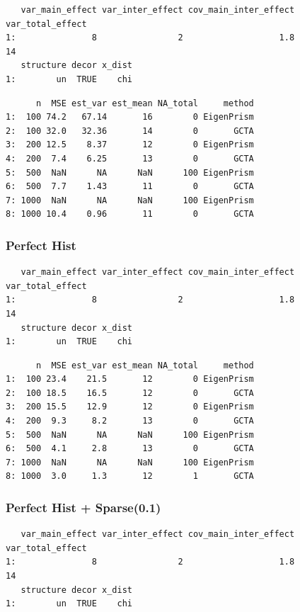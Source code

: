 \documentclass[]{article}
\begin{document}
\begin{verbatim}
   var_main_effect var_inter_effect cov_main_inter_effect var_total_effect
1:               8                2                   1.8               14
   structure decor x_dist
1:        un  TRUE    chi
\end{verbatim}

\begin{verbatim}
      n  MSE est_var est_mean NA_total     method
1:  100 74.2   67.14       16        0 EigenPrism
2:  100 32.0   32.36       14        0       GCTA
3:  200 12.5    8.37       12        0 EigenPrism
4:  200  7.4    6.25       13        0       GCTA
5:  500  NaN      NA      NaN      100 EigenPrism
6:  500  7.7    1.43       11        0       GCTA
7: 1000  NaN      NA      NaN      100 EigenPrism
8: 1000 10.4    0.96       11        0       GCTA
\end{verbatim}

\subsubsection{Perfect Hist}\label{perfect-hist}

\begin{verbatim}
   var_main_effect var_inter_effect cov_main_inter_effect var_total_effect
1:               8                2                   1.8               14
   structure decor x_dist
1:        un  TRUE    chi
\end{verbatim}

\begin{verbatim}
      n  MSE est_var est_mean NA_total     method
1:  100 23.4    21.5       12        0 EigenPrism
2:  100 18.5    16.5       12        0       GCTA
3:  200 15.5    12.9       12        0 EigenPrism
4:  200  9.3     8.2       13        0       GCTA
5:  500  NaN      NA      NaN      100 EigenPrism
6:  500  4.1     2.8       13        0       GCTA
7: 1000  NaN      NA      NaN      100 EigenPrism
8: 1000  3.0     1.3       12        1       GCTA
\end{verbatim}

\subsubsection{Perfect Hist + Sparse(0.1)}\label{perfect-hist-sparse0.1}

\begin{verbatim}
   var_main_effect var_inter_effect cov_main_inter_effect var_total_effect
1:               8                2                   1.8               14
   structure decor x_dist
1:        un  TRUE    chi
\end{verbatim}
\end{document}
